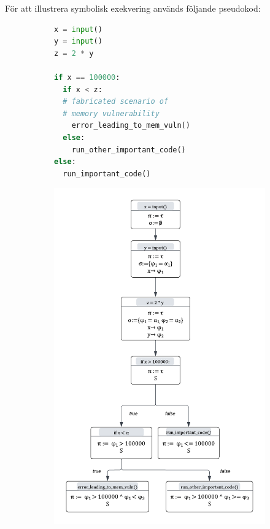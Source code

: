 För att illustrera symbolisk exekvering används följande pseudokod:

\begin{figure}[H]
  \hspace*{-2cm}
  \begin{subfigure}[b]{0.58\textwidth}
    \begin{lstlisting}[language=Python, frame=single]
x = input()
y = input()
z = 2 * y

if x == 100000:
  if x < z:
  # fabricated scenario of
  # memory vulnerability
    error_leading_to_mem_vuln()
  else:
    run_other_important_code()
else:
  run_important_code()
\end{lstlisting}
    \caption{} %
    \label{fig:symbex_example_code}
  \end{subfigure}
  \hspace*{\fill}
  \begin{subfigure}[t]{0.5\textwidth}
    \centering
    \includegraphics[scale=0.38]{figures/final_symbolic_example_graph.png}

\end{subfigure}
\end{figure}
